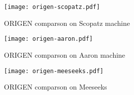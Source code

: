 

\begin{figure}[!ht]
\centering
\texttt{[image: origen-scopatz.pdf]}
\caption{ORIGEN comparson on Scopatz machine}
\label{fig:origen-scopatz}
\end{figure}

\begin{figure}[!ht]
\centering
\texttt{[image: origen-aaron.pdf]}
\caption{ORIGEN comparson on Aaron machine}
\label{fig:origen-aaron}
\end{figure}

\begin{figure}[!ht]
\centering
\texttt{[image: origen-meeseeks.pdf]}
\caption{ORIGEN comparson on Meeseeks}
\label{fig:origen-meeseeks}
\end{figure}
